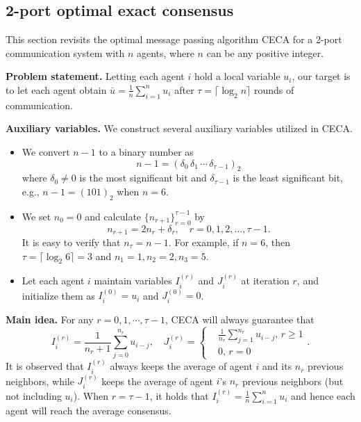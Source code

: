 \documentclass{article}
\newcommand{\ro}{{(r)}}
\newcommand{\sumin}{\sum_{i=1}^n}
\theoremstyle{plain}
\theoremstyle{definition}
\begin{document}
\subsection{2-port optimal exact consensus}
\label{sec:CECA-allreduce-alg}
This section revisits the optimal message passing algorithm CECA \cite{bar1993optimal} for a 2-port communication system with $n$ agents, where $n$ can be any positive integer.

\textbf{Problem statement.} Letting each agent $i$ hold a local variable $u_i$, our target is to let each agent obtain $\bar{u} = \frac{1}{n}\sumin u_i$ after $\tau=\lceil \log_2 n \rceil$ rounds of communication.

\textbf{Auxiliary variables.} {We construct several auxiliary variables utilized in CECA.}
\begin{itemize}[leftmargin=10pt]
\item We convert $n-1$ to a binary number as 
\begin{equation}
\label{eq:bin-n-1}
n-1 = (\delta_0\,\delta_1\,\cdots\, \delta_{\tau-1} )_2
\end{equation}
where $\delta_0 \neq 0$ is the most significant bit and $\delta_{\tau-1}$ is the least significant bit,  e.g., $n-1=(101)_2$ when $n=6$.
\item We set $n_0 = 0$ and calculate $\{n_{r+1}\}_{r=0}^{\tau-1}$ by 
\begin{equation}
\label{eq:iter-nr}
n_{r+1}=2n_r+\delta_r,\quad r=0,1,2,\ldots,\tau-1.
\end{equation}
It is easy to verify that $n_\tau = n-1$. For example, if $n=6$, then $\tau=\lceil \log_2 6 \rceil=3$ and $n_1=1,n_2=2,n_3=5$.
\item Let each agent $i$ maintain variables $I_i^{(r)}$ and $J^\ro_i$ at iteration $r$, and initialize them as $I_i^{(0)} = u_i$ and $J^{(0)}_i = 0$. 
\end{itemize}

\textbf{Main idea.} For any $r=0,1,\cdots, \tau-1$, CECA will always guarantee that 
\begin{equation}
\label{z7u23bn}
I_i^{(r)} = \frac{1}{n_r+1}\sum_{j=0}^{n_r}u_{i-j}, \quad 
J_i^{(r)} = 
\left\{
\begin{split}
    &\frac{1}{n_r}\sum_{j=1}^{n_r}u_{i-j},\,r\geq 1\\
    &0,\,r=0
\end{split}
\right..
\end{equation}
It is observed that $I_i^{(r)}$ always keeps the average of agent $i$ and its $n_r$ previous neighbors, while $J_i^{(r)}$ keeps the average of agent $i$'s $n_r$ previous neighbors (but not including $u_i$).  When $r = \tau-1$, it holds that $I_i^{(r)} = \frac{1}{n}\sumin u_i$ and hence each agent will reach the average consensus.
\end{document}
